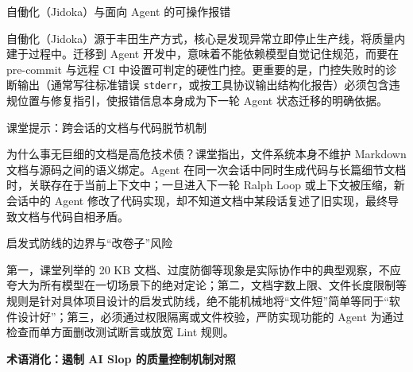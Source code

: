 \documentclass[UTF8,a4paper,11pt,fontset=fandol]{ctexart}
\begin{document}
\begin{importantbox}{自{\cjkfallback 働}化（Jidoka）与面向 Agent 的可操作报错}

自{\cjkfallback 働}化（Jidoka）源于丰田生产方式，核心是发现异常立即停止生产线，将质量内建于过程中。迁移到 Agent 开发中，意味着不能依赖模型自觉记住规范，而要在 pre-commit 与远程 CI 中设置可判定的硬性门控。更重要的是，门控失败时的诊断输出（通常写往标准错误 \texttt{stderr}，或按工具协议输出结构化报告）必须包含违规位置与修复指引，使报错信息本身成为下一轮 Agent 状态迁移的明确依据。

\end{importantbox}

\begin{knowledgebox}{课堂提示：跨会话的文档与代码脱节机制}

为什么事无巨细的文档是高危技术债？课堂指出，文件系统本身不维护 Markdown 文档与源码之间的语义绑定。Agent 在同一次会话中同时生成代码与长篇细节文档时，关联存在于当前上下文中；一旦进入下一轮 Ralph Loop 或上下文被压缩，新会话中的 Agent 修改了代码实现，却不知道文档中某段话复述了旧实现，最终导致文档与代码自相矛盾。

\end{knowledgebox}

\begin{warningbox}{启发式防线的边界与“改卷子”风险}

第一，课堂列举的 20 KB 文档、过度防御等现象是实际协作中的典型观察，不应夸大为所有模型在一切场景下的绝对定论；第二，文档字数上限、文件长度限制等规则是针对具体项目设计的启发式防线，绝不能机械地将“文件短”简单等同于“软件设计好”；第三，必须通过权限隔离或文件校验，严防实现功能的 Agent 为通过检查而单方面删改测试断言或放宽 Lint 规则。

\end{warningbox}

\par{}\textbf{术语消化：遏制 AI Slop 的质量控制机制对照}
\end{document}
